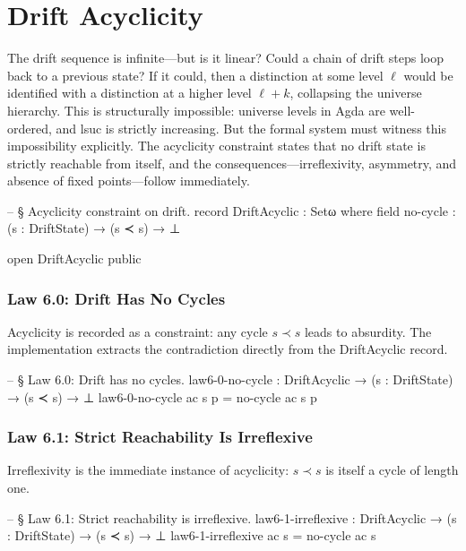 \documentclass[11pt,a4paper]{book}
\def\texttt#1{#1}%
\begin{document}
\chapter{Drift Acyclicity}

The drift sequence is infinite—but is it linear? Could a chain of drift steps loop back to a previous state? If it could, then a distinction at some level $\ell$ would be identified with a distinction at a higher level $\ell + k$, collapsing the universe hierarchy. This is structurally impossible: universe levels in Agda are well-ordered, and \texttt{lsuc} is strictly increasing. But the formal system must witness this impossibility explicitly. The acyclicity constraint states that no drift state is strictly reachable from itself, and the consequences—irreflexivity, asymmetry, and absence of fixed points—follow immediately.

\begin{code}
-- § Acyclicity constraint on drift.
record DriftAcyclic : Setω where
  field
    no-cycle : (s : DriftState) → (s ≺ s) → ⊥

open DriftAcyclic public
\end{code}

\subsection{Law 6.0: Drift Has No Cycles}

Acyclicity is recorded as a constraint: any cycle $s \prec s$ leads to absurdity.
The implementation extracts the contradiction directly from the \texttt{DriftAcyclic} record.

\begin{code}
-- § Law 6.0: Drift has no cycles.
law6-0-no-cycle : DriftAcyclic → (s : DriftState) → (s ≺ s) → ⊥
law6-0-no-cycle ac s p = no-cycle ac s p
\end{code}

\subsection{Law 6.1: Strict Reachability Is Irreflexive}

Irreflexivity is the immediate instance of acyclicity: $s \prec s$ is itself a cycle of length one.

\begin{code}
-- § Law 6.1: Strict reachability is irreflexive.
law6-1-irreflexive : DriftAcyclic → (s : DriftState) → (s ≺ s) → ⊥
law6-1-irreflexive ac s = no-cycle ac s
\end{code}
\end{document}
